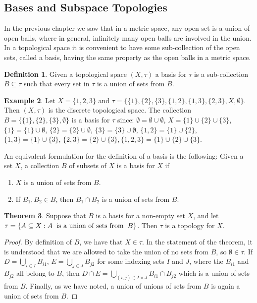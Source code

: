 \documentclass[11pt,a4paper]{article}
\theoremstyle{definition}
\newtheorem{thm}{Theorem}[subsection]
\newtheorem{defn}[thm]{Definition}
\newtheorem{exa}[thm]{Example}
\begin{document}
\subsection{Bases and Subspace Topologies}
In the previous chapter we saw that in a metric space, any open set is a union of open balls, where in general, infinitely many open balls are involved in the union.  In a topological space it is convenient to have some sub-collection of the open sets, called a basis, having the same property as the open balls in a metric space.



\begin{defn}
Given a topological space $(X,\tau)$ a basis for $\tau$ is a sub-collection $B\subseteq \tau$ such that every set in $\tau$ is a union of sets from $B$.
\end{defn}


\begin{exa}
Let $X=\{1,2,3\}$ and $\tau =\{\{1\},\{2\},\{3\},\{1,2\},\{1,3\},\{2,3\},X,\emptyset \}$. Then $(X,\tau)$ is the discrete topological space. The collection $B=\{\{1\},\{2\},\{3\},\emptyset \}$ is a basis for $\tau$ since: $\emptyset =\emptyset \cup\emptyset$, $X=\{1\}\cup \{2\}\cup \{3\}$, $\{1\}=\{1\}\cup \emptyset$, $\{2\}=\{2\}\cup \emptyset$, $\{3\}=\{3\}\cup \emptyset$, $\{1,2\}=\{1\}\cup \{2\}$, $\{1,3\}=\{1\}\cup \{3\}$, $\{2,3\}=\{2\}\cup \{3\},\{1,2,3\}=\{1\}\cup \{2\}\cup \{3\}$.
\end{exa}

An equivalent formulation for the definition of a basis is the following: Given a set $X$, a collection $B$ of subsets of $X$ is a basis for $X$ if
\begin{enumerate}
\item[i] $X$ is a union of sets from $B$.
\item[ii] If $B_1, B_2\in B$, then $B_1\cap B_2$ is a union of sets from $B$.
\end{enumerate} 





\begin{thm}
Suppose that $B$ is a basis for a non-empty set $X$, and let $\tau =\{A\subseteq X: A \hspace{0.2cm} \text{is a union of sets from}\hspace{0.2cm} B\}$. Then $\tau$ is a topology for $X$.
\end{thm}

\begin{proof}
By definition of $B$, we have that $X\in \tau$. In the statement of the theorem, it is understood that we are allowed to take the union of no sets from $B$, so $\emptyset \in \tau$. If $D=\bigcup_{i\in I} B_{i1}$, $E=\bigcup_{j\in J}B_{j2}$ for some indexing sets $I$ and $J$, where the $B_{i1}$ and $B_{j2}$ all belong to $B$, then $D\cap E=\bigcup_{(i,j)\in I\times J} B_{i1}\cap B_{j2}$ which is a union of sets from $B$. Finally, as we have noted, a union of  unions of sets from $B$ is again a union of sets from $B$.
\end{proof}
\end{document}
